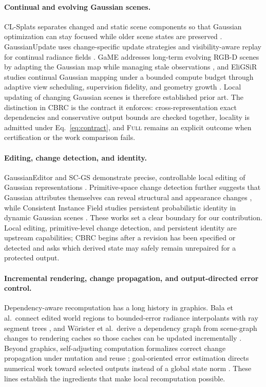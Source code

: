 \documentclass[acmtog,nonacm]{acmart}
\newcommand{\method}{CBRC}
\newcommand{\FULL}{\textsc{Full}}
\begin{document}
\paragraph{Continual and evolving Gaussian scenes.}
CL-Splats separates changed and static scene components so that Gaussian optimization can stay focused while older scene states are preserved \citep{ackermann2025clsplats}. GaussianUpdate uses change-specific update strategies and visibility-aware replay for continual radiance fields \citep{zeng2025gaussianupdate}. GaME addresses long-term evolving RGB-D scenes by adapting the Gaussian map while managing stale observations \citep{yugay2026game}, and EliGSiR studies continual Gaussian mapping under a bounded compute budget through adaptive view scheduling, supervision fidelity, and geometry growth \citep{ellensohn2026eligsir}. Local updating of changing Gaussian scenes is therefore established prior art. The distinction in \method{} is the contract it enforces: cross-representation exact dependencies and conservative output bounds are checked together, locality is admitted under Eq.~\ref{eq:contract}, and \FULL{} remains an explicit outcome when certification or the work comparison fails.

\paragraph{Editing, change detection, and identity.}
GaussianEditor and SC-GS demonstrate precise, controllable local editing of Gaussian representations \citep{chen2024gaussianeditor,huang2024scgs}. Primitive-space change detection further suggests that Gaussian attributes themselves can reveal structural and appearance changes \citep{galappaththige2026pixels}, while Consistent Instance Field studies persistent probabilistic identity in dynamic Gaussian scenes \citep{wu2026cif}. These works set a clear boundary for our contribution. Local editing, primitive-level change detection, and persistent identity are upstream capabilities; \method{} begins after a revision has been specified or detected and asks which derived state may safely remain unrepaired for a protected output.

\paragraph{Incremental rendering, change propagation, and output-directed error control.}
Dependency-aware recomputation has a long history in graphics. Bala et al.\ connect edited world regions to bounded-error radiance interpolants with ray segment trees \citep{bala1999raysegment}, and W\"orister et al.\ derive a dependency graph from scene-graph changes to rendering caches so those caches can be updated incrementally \citep{woerister2013lazy}. Beyond graphics, self-adjusting computation formalizes correct change propagation under mutation and reuse \citep{acar2013selfadjusting}; goal-oriented error estimation directs numerical work toward selected outputs instead of a global state norm \citep{oden2001goal}. These lines establish the ingredients that make local recomputation possible.
\end{document}
